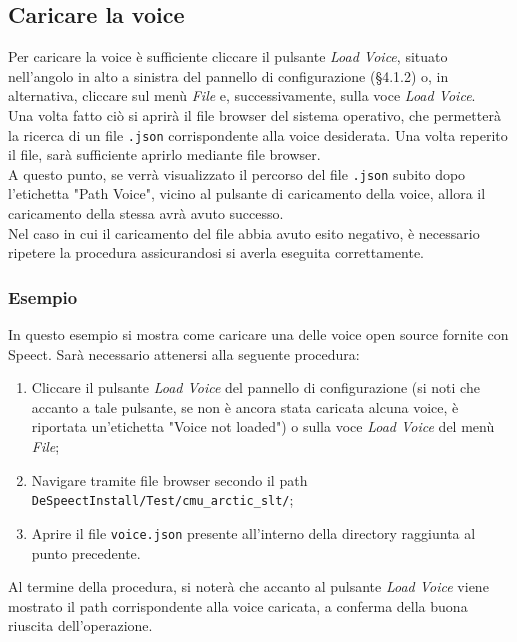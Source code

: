 \documentclass[openany,12pt,a4paper]{report}
\begin{document}
	\subsection{Caricare la voice}
	Per caricare la voice è sufficiente cliccare il pulsante \textit{Load Voice}, situato nell'angolo in alto a sinistra del pannello di configurazione (§4.1.2) o, in alternativa, cliccare sul menù \textit{File} e, successivamente, sulla voce \textit{Load Voice}.\\
	Una volta fatto ciò si aprirà il file browser del sistema operativo, che permetterà la ricerca di un file \verb|.json| corrispondente alla voice desiderata. Una volta reperito il file, sarà sufficiente aprirlo mediante file browser.\\
	A questo punto, se verrà visualizzato il percorso del file \verb|.json| subito dopo l'etichetta "Path Voice", vicino al pulsante di caricamento della voice, allora il caricamento della stessa avrà avuto successo.\\
	Nel caso in cui il caricamento del file abbia avuto esito negativo, è necessario ripetere la procedura assicurandosi si averla eseguita correttamente.
	
	\subsubsection*{Esempio}
	
	In questo esempio si mostra come caricare una delle voice open source fornite con Speect. Sarà necessario attenersi alla seguente procedura:
	
	\begin{enumerate}
		\item Cliccare il pulsante \textit{Load Voice} del pannello di configurazione (si noti che accanto a tale pulsante, se non è ancora stata caricata alcuna voice, è riportata un'etichetta "Voice not loaded") o sulla voce \textit{Load Voice} del menù \textit{File};
		\item Navigare tramite file browser secondo il path \\ \verb|DeSpeectInstall/Test/cmu_arctic_slt/|;
		\item Aprire il file \verb|voice.json| presente all'interno della directory raggiunta al punto precedente. 
	\end{enumerate} 

	\noindent Al termine della procedura, si noterà che accanto al pulsante \textit{Load Voice} viene mostrato il path corrispondente alla voice caricata, a conferma della buona riuscita dell'operazione.
	
\end{document}

